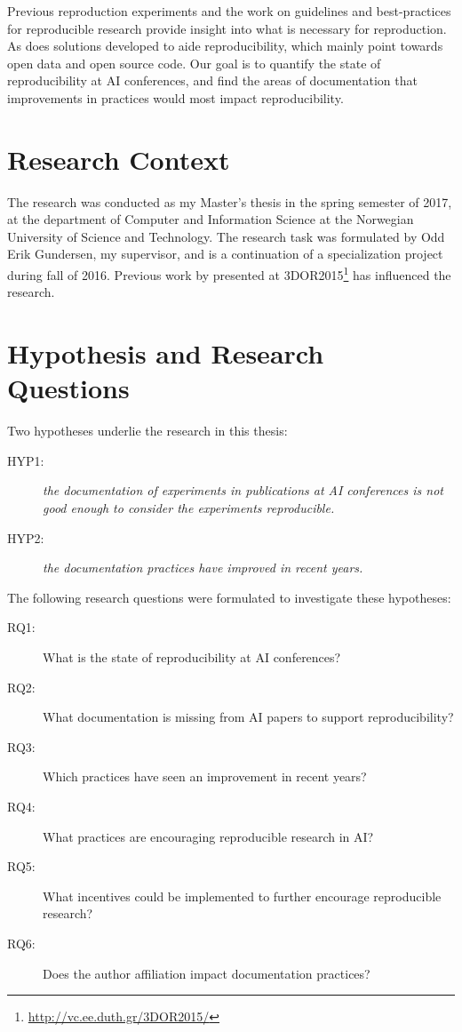 Previous reproduction experiments and the work on guidelines and best-practices for reproducible research \citep{Sandve_2013, stodden2014best-practices} provide insight into what is necessary for reproduction. As does solutions developed to aide reproducibility, which mainly point towards open data and open source code. Our goal is to quantify the state of reproducibility at AI conferences, and find the areas of documentation that improvements in practices would most impact reproducibility.

\section{Research Context}
The research was conducted as my Master's thesis in the spring semester of 2017, at the department of Computer and Information Science at the Norwegian University of Science and Technology. The research task was formulated by Odd Erik Gundersen, my supervisor, and is a continuation of a specialization project during fall of 2016. Previous work by \cite{Gundersen2015} presented at 3DOR2015\footnote{\url{http://vc.ee.duth.gr/3DOR2015/}} has influenced the research.

\section{Hypothesis and Research Questions}
Two hypotheses underlie the research in this thesis:
\begin{description}
\item[HYP1:] \emph{the documentation of experiments in publications at AI conferences is not good enough to consider the experiments reproducible.}
\item[HYP2:] \emph{the documentation practices have improved in recent years.}
\end{description}

The following research questions were formulated to investigate these hypotheses:
\begin{description}
\item[RQ1:] What is the state of reproducibility at AI conferences?
\item[RQ2:] What documentation is missing from AI papers to support reproducibility?
\item[RQ3:] Which practices have seen an improvement in recent years?
\item[RQ4:] What practices are encouraging reproducible research in AI?
\item[RQ5:] What incentives could be implemented to further encourage reproducible research?
\item[RQ6:] Does the author affiliation impact documentation practices?
\end{description}

